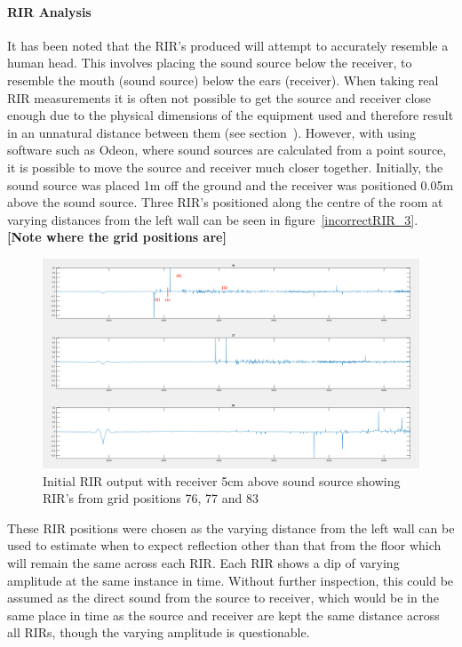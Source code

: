 \documentclass[../../main.tex]{subfiles}
\begin{document}
			\paragraph{RIR Analysis}
			It has been noted that the \ac{RIR}'s produced will attempt to accurately resemble a human head. This involves placing the sound source below the receiver, to resemble the mouth (sound source) below the ears (receiver). When taking real \ac{RIR} measurements it is often not possible to get the source and receiver close enough due to the physical dimensions of the equipment used and therefore result in an unnatural distance between them (see section~). However, with using software such as Odeon, where sound sources are calculated from a point source, it is possible to move the source and receiver much closer together. Initially, the sound source was placed 1m off the ground and the receiver was positioned 0.05m above the sound source. Three \ac{RIR}'s positioned along the centre of the room at varying distances from the left wall can be seen in figure~\ref{incorrectRIR_3}. \textbf{[Note where the grid positions are]}



			\begin{figure}[H]
				\center\includegraphics[scale = 0.3]{Sections/Implementation/Odeon/images/incorrectRIR/RIR_76_incorrect_edit.png}
				\caption{Initial \ac{RIR} output with receiver 5cm above sound source showing \ac{RIR}'s from grid positions 76, 77 and 83}
				\label{incorrectRIR}
			\end{figure}

			These \ac{RIR} positions were chosen as the varying distance from the left wall can be used to estimate when to expect reflection other than that from the floor which will remain the same across each \ac{RIR}. Each \ac{RIR} shows a dip of varying amplitude at the same instance in time. Without further inspection, this could be assumed as the direct sound from the source to receiver, which would be in the same place in time as the source and receiver are kept the same distance across all RIRs, though the varying amplitude is questionable.
\end{document}
